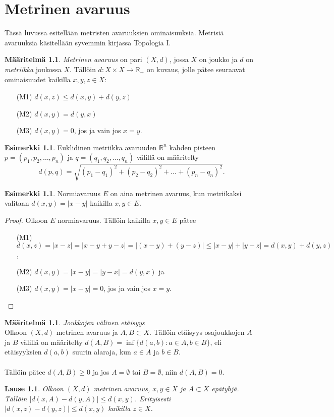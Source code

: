 \documentclass[12pt,a4paper,leqno]{report}
\newcommand{\R}{\mathbb{R}}
\theoremstyle{plain}
\newtheorem{lause}[equation]{Lause}
\theoremstyle{definition}
\newtheorem{maar}[equation]{Määritelmä}
\newtheorem{esim}[equation]{Esimerkki}
\theoremstyle{remark}
\begin{document}
\chapter{Metrinen avaruus}\label{metrinen}
Tässä luvussa esitellään metristen avaruuksien ominaisuuksia. Metrisiä avaruuksia käsitellään syvemmin kirjassa Topologia I.%
\begin{maar} \emph{Metrinen avaruus} 
on pari $(X,d)$, jossa $X$ on joukko ja $d$ on \emph{metriikka} joukossa $X$.
Tällöin $d\colon X\times X\rightarrow \R_+$ on kuvaus, jolle pätee seuraavat ominaisuudet kaikilla $x,y,z\in X$:
\begin{itemize}
\item[(M1)]$d(x,z)\leq d(x,y)+d(y,z)$
\item[(M2)]$d(x,y)=d(y,x)$
\item[(M3)]$d(x,y)=0$, jos ja vain jos $x=y$.
\end{itemize} 
\end{maar} 

\begin{esim}
Euklidinen metriikka avaruuden $\R^n$ kahden pisteen $p=(p_1,p_2,\dots,p_n)$ ja $q=(q_1,q_2,\dots,q_n)$ välillä on määritelty 
$$d(p,q)=\sqrt{(p_1-q_1)^2+(p_2-q_2)^2+\dots+(p_n-q_n)^2}.$$
\end{esim}

\begin{esim}
Normiavaruus $E$ on aina metrinen avaruus, kun metriikaksi valitaan $d(x,y)=|x-y|$ kaikilla $x,y\in E$. 

\begin{proof}
Olkoon $E$ normiavaruus. 
Tällöin kaikilla $x,y\in E$ pätee
\begin{itemize}
\item[(M1)]%
$d(x,z)=|x-z|=|x-y+y-z|=|(x-y)+(y-z)|\leq|x-y|+|y-z|=d(x,y)+d(y,z)$,
\item[(M2)]$d(x,y)=|x-y|=|y-x|=d(y,x)$ ja
\item[(M3)]$d(x,y)=|x-y|=0$, jos ja vain jos $x=y$.
\end{itemize}
\end{proof}

\end{esim}
\begin{maar}\emph{Joukkojen välinen etäisyys}\\
Olkoon $(X,d)$ metrinen avaruus ja $A,B\subset X$. Tällöin etäisyys osajoukkojen $A$ ja $B$ välillä on määritelty $d(A,B)=\inf\{d(a,b)\colon a\in A, b\in B\}$, eli etäisyyksien $d(a,b)$ suurin alaraja, kun $a\in A$ ja $b\in B$. \\
\\
Tällöin pätee $d(A,B)\geq 0$ ja jos $A= \emptyset$ tai $B= \emptyset$, niin $d(A,B)= 0$. 

\end{maar}
\begin{lause}
Olkoon $(X,d)$ metrinen avaruus, $x,y\in X$ ja $A\subset X$ epätyhjä. Tällöin $|d(x,A)-d(y,A)|\leq d(x,y)$. Erityisesti $|d(x,z)-d(y,z)|\leq d(x,y)$ kaikilla $z\in X$.
\end{lause}
\end{document}
